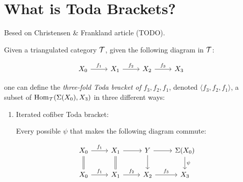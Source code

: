 \section{What is Toda Brackets?}

Besed on Christensen \& Frankland article (TODO).

\begin{definition}
    Given a triangulated category \( \mathcal{T} \), given the following diagram in \( \mathcal{T} \):

    \[\begin{tikzcd}
        {X_0} & {X_1} & {X_2} & {X_3}
        \arrow["{f_1}", from=1-1, to=1-2]
        \arrow["{f_2}", from=1-2, to=1-3]
        \arrow["{f_3}", from=1-3, to=1-4]
    \end{tikzcd}\]

    one can define the \emph{three-fold Toda bracket of \( f_3, f_2, f_1 \)}, denoted \( \langle f_3, f_2, f_1 \rangle \), a subset of \( \operatorname{Hom}_{\mathcal{T}}(\Sigma(X_0), X_3) \) in three different ways: \sloppy

    \begin{enumerate}
        \item {
            Iterated cofiber Toda bracket:

            Every possible \( \psi \) that makes the following diagram commute:

            \[\begin{tikzcd}
                {X_0} & {X_1} & {Y} & {\Sigma(X_0)} \\
                {X_0} & {X_1} & {X_2} & {X_3}
                \arrow["{f_1}", from=1-1, to=1-2]
                \arrow[from=1-2, to=1-3]
                \arrow[from=1-3, to=1-4]
                \arrow[Rightarrow, no head, from=1-1, to=2-1]
                \arrow[Rightarrow, no head, from=1-2, to=2-2]
                \arrow[from=1-3, to=2-3]
                \arrow["\psi", from=1-4, to=2-4]
                \arrow["{f_1}", from=2-1, to=2-2]
                \arrow["{f_2}", from=2-2, to=2-3]
                \arrow["{f_3}", from=2-3, to=2-4]
            \end{tikzcd}\]

}
\end{enumerate}
\end{definition}
